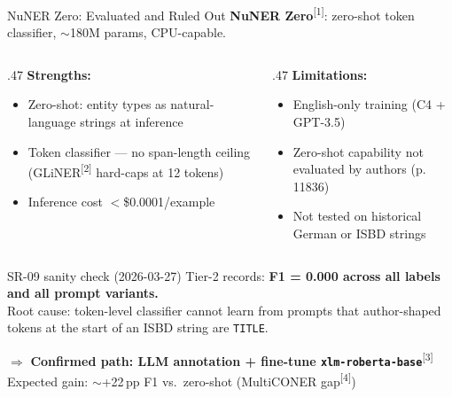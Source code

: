 \documentclass[xcolor,aspectratio=169,compress]{beamer}
\begin{document}
\begin{frame}{NuNER Zero: Evaluated and Ruled Out}
  \small
  \textbf{NuNER Zero}\textsuperscript{[1]}: zero-shot token classifier, $\sim$180M params, CPU-capable.
  \smallskip
  \begin{columns}
    \begin{column}{.47\textwidth}
      \textbf{Strengths:}
      \begin{itemize}\setlength{\itemsep}{2pt}
        \item[$\checkmark$] Zero-shot: entity types as natural-language strings at inference
        \item[$\checkmark$] Token classifier --- no span-length ceiling
              (GLiNER\textsuperscript{[2]} hard-caps at 12 tokens)
        \item[$\checkmark$] Inference cost $<$\$0.0001/example
      \end{itemize}
    \end{column}
    \begin{column}{.47\textwidth}
      \textbf{Limitations:}
      \begin{itemize}\setlength{\itemsep}{2pt}
        \item[$\times$] English-only training (C4 + GPT-3.5)
        \item[$\times$] Zero-shot capability not evaluated by authors (p.\,11836)
        \item[$\times$] Not tested on historical German or ISBD strings
      \end{itemize}
    \end{column}
  \end{columns}
  \smallskip
  \begin{alertblock}{SR-09 sanity check (2026-03-27)}
    Tier-2 records: \textbf{F1 = 0.000 across all labels and all prompt variants.} \\
    Root cause: token-level classifier cannot learn from prompts that
    author-shaped tokens at the start of an ISBD string are \texttt{TITLE}.
  \end{alertblock}
  \smallskip
  $\Rightarrow$ \textbf{Confirmed path: LLM annotation + fine-tune \texttt{xlm-roberta-base}}\textsuperscript{[3]} \\
  \hspace*{1.4em} Expected gain: $\sim$+22\,pp F1 vs.\ zero-shot (MultiCONER gap\textsuperscript{[4]})
\end{frame}
\end{document}
